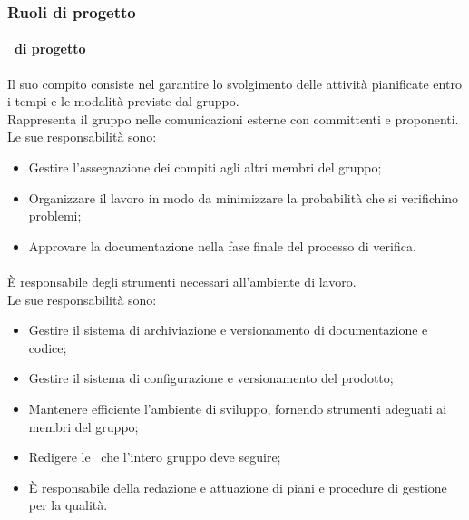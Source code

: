   \subsubsection{Ruoli di progetto}
  \paragraph{\roleProjectManager\ di progetto}
      Il suo compito consiste nel garantire lo svolgimento delle attività pianificate entro i tempi e le modalità previste dal gruppo.\\
        Rappresenta il gruppo nelle comunicazioni esterne con committenti e proponenti.\\
        Le sue responsabilità sono:
        \begin{itemize}
          \item Gestire l'assegnazione dei compiti agli altri membri del gruppo;
          \item Organizzare il lavoro in modo da minimizzare la probabilità che si verifichino problemi;
          \item Approvare la documentazione nella fase finale del processo di verifica.
        \end{itemize}

      \paragraph{\roleAdministrator}
        È responsabile degli strumenti necessari all'ambiente di lavoro.\\
        Le sue responsabilità sono:
        \begin{itemize}
          \item Gestire il sistema di archiviazione e versionamento di documentazione e codice;
          \item Gestire il sistema di configurazione e versionamento del prodotto;
          \item Mantenere efficiente l'ambiente di sviluppo, fornendo strumenti adeguati ai membri del gruppo;
          \item Redigere le \docNameVersionNdP\ che l'intero gruppo deve seguire;
          \item È responsabile della redazione e attuazione di piani e procedure di gestione per la qualità.
        \end{itemize}

